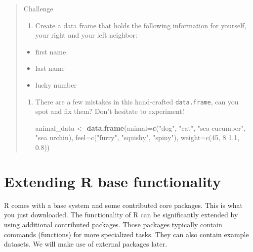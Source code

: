 \documentclass[
]{book}
\newenvironment{Shaded}{\begin{snugshade}}{\end{snugshade}}
\newcommand{\AttributeTok}[1]{\textcolor[rgb]{0.13,0.29,0.53}{#1}}
\newcommand{\FunctionTok}[1]{\textcolor[rgb]{0.13,0.29,0.53}{\textbf{#1}}}
\newcommand{\NormalTok}[1]{#1}
\newcommand{\OtherTok}[1]{\textcolor[rgb]{0.56,0.35,0.01}{#1}}
\newcommand{\StringTok}[1]{\textcolor[rgb]{0.31,0.60,0.02}{#1}}
\providecommand{\tightlist}{%
  \setlength{\itemsep}{0pt}\setlength{\parskip}{0pt}}
\begin{document}
\begin{quote}
Challenge

\begin{enumerate}
\def\labelenumi{\arabic{enumi}.}
\tightlist
\item
  Create a data frame that holds the following information for yourself,
  your right and your left neighbor:
\end{enumerate}

\begin{itemize}
\tightlist
\item
  first name
\item
  last name
\item
  lucky number
\end{itemize}

\begin{enumerate}
\def\labelenumi{\arabic{enumi}.}
\setcounter{enumi}{1}
\item
  There are
  a few mistakes in this hand-crafted \texttt{data.frame}, can you spot and fix them?
  Don't hesitate to experiment!

\begin{Shaded}
\begin{Highlighting}[]
\NormalTok{animal\_data }\OtherTok{\textless{}{-}} \FunctionTok{data.frame}\NormalTok{(}\AttributeTok{animal=}\FunctionTok{c}\NormalTok{(}\StringTok{"dog"}\NormalTok{, }\StringTok{"cat"}\NormalTok{, }\StringTok{"sea cucumber"}\NormalTok{, }\StringTok{"sea urchin),}
\StringTok{                          feel=c("}\NormalTok{furry}\StringTok{", "}\NormalTok{squishy}\StringTok{", "}\NormalTok{spiny}\StringTok{"),}
\StringTok{                          weight=c(45, 8 1.1, 0.8))}
\end{Highlighting}
\end{Shaded}
\end{enumerate}
\end{quote}

\section{Extending R base functionality}\label{extending-r-base-functionality}

R comes with a base system and some contributed core packages. This is what you just downloaded. The functionality of R can be significantly extended by using additional contributed packages. Those packages typically contain commands (functions) for more specialized tasks. They can also contain example datasets. We will make use of external packages later.
\end{document}
